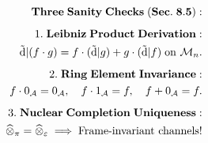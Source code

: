 \documentclass[preview]{standalone}
\begin{document}
\begin{align*}
\special{dvisvgm:raw <g id='unique000'>}\mathbf{Three\;Sanity\;Checks\;(Sec.\;8.5):}\\[5pt]1.\;\mathbf{Leibniz\;Product\;Derivation:}\\\;\;\tilde{\mathrm{d}}|(f\cdot g) = f\cdot(\tilde{\mathrm{d}}|g) + g\cdot(\tilde{\mathrm{d}}|f)\;\text{on }\mathcal{M}_n.\\[5pt]2.\;\mathbf{Ring\;Element\;Invariance:}\\\;\;f\cdot 0_{\mathcal{A}}=0_{\mathcal{A}},\quad f\cdot 1_{\mathcal{A}}=f,\quad f+0_{\mathcal{A}}=f.\\[5pt]3.\;\mathbf{Nuclear\;Completion\;Uniqueness:}\\\;\;\widehat{\otimes}_\pi = \widehat{\otimes}_\varepsilon\implies\text{Frame-invariant channels!}\special{dvisvgm:raw </g>}
\end{align*}
\end{document}
